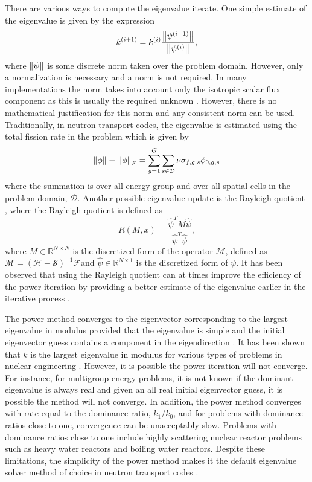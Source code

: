 There are various ways to compute the eigenvalue iterate. One simple estimate of the eigenvalue is given by the expression
\begin{equation}
k^{(i+1)} = k^{(i)} \frac{ \left\lVert\psi^{(i+1)}\right\rVert}{\left\lVert\psi^{(i)}\right\rVert},
\end{equation}
where $\left\lVert\psi\right\rVert$ is some discrete norm taken over the problem domain. However, only a normalization is necessary and a norm is not required. In many implementations the norm takes into account only the isotropic scalar flux component as this is usually the required unknown \cite{warsa2004krylov}. However, there is no mathematical justification for this norm and any consistent norm can be used. Traditionally, in neutron transport codes, the eigenvalue is estimated using the total fission rate in the problem \cite{warsa2004krylov} which is given by 
\begin{equation}
	\left\lVert\phi\right\rVert \equiv \left\lVert\phi\right\rVert_{F} = \sum_{g=1}^{G} \sum_{s \in \mathcal{D}} \nu \sigma_{f,g,s} \phi_{0,g,s}
\end{equation}
where the summation is over all energy group and over all spatial cells in the problem domain, $\mathcal{D}$. Another possible eigenvalue update is the Rayleigh quotient \cite{horn_matrix_2012}, where the Rayleigh quotient is defined as
\begin{equation}
	R(M,x) = \frac{\hat{\psi}^{T}M\hat{\psi}}{\hat{\psi}^{T}\hat{\psi}},
\end{equation}
where $M \in \mathbb{R}^{N \times N}$ is the discretized form of the operator $\mathcal{M}$, defined as $\mathcal{M} = (\mathcal{H} - \mathcal{S})^{-1} \mathcal{F}$and $\hat{\psi} \in \mathbb{R}^{N \times 1}$ is the discretized form of $\psi$. It has been observed that using the Rayleigh quotient can at times improve the efficiency of the power iteration by providing a better estimate of the eigenvalue earlier in the iterative process \cite{warsa2004krylov}.

The power method converges to the eigenvector corresponding to the largest eigenvalue in modulus provided that the eigenvalue is simple and the initial eigenvector guess contains a component in the eigendirection \cite{golub_matrix_2012}. It has been shown that $k$ is the largest eigenvalue in modulus for various types of problems in nuclear engineering \cite{modak_evaluation_1995}. However, it is possible the power iteration will not converge. For instance, for multigroup energy problems, it is not known if the dominant eigenvalue is always real and given an all real initial eigenvector guess, it is possible the method will not converge. In addition, the power method converges with rate equal to the dominance ratio, $k_{1}/k_{0}$, and for problems with dominance ratios close to one, convergence can be unacceptably slow. Problems with dominance ratios close to one include highly scattering nuclear reactor problems such as heavy water reactors and boiling water reactors. Despite these limitations, the simplicity of the power method makes it the default eigenvalue solver method of choice in neutron transport codes \cite{duderstadt_nuclear_1976}.


